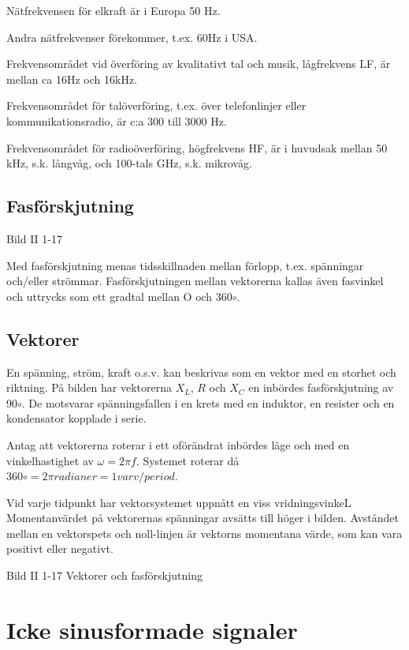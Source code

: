 \documentclass[a4paper,twoside,twocolumn,openright]{book}
\begin{document}
Nätfrekvensen för elkraft är i Europa 50 Hz.

Andra nätfrekvenser förekommer, t.ex. 60Hz i USA.

Frekvensområdet vid överföring av kvalitativt tal och musik, lågfrekvens LF, är mellan ca 16Hz och 16kHz.

Frekvensområdet för talöverföring, t.ex. över telefonlinjer eller kommunikationsradio,
är c:a 300 till 3000 Hz.

Frekvensområdet för radioöverföring, högfrekvens HF, är i huvudsak mellan 50 kHz, s.k.
långvåg, och 100-tals GHz, s.k. mikrovåg.

\subsection{Fasförskjutning}

Bild II 1-17

Med fasförskjutning menas tidsskillnaden mellan förlopp, t.ex. spänningar och/eller
strömmar. Fasförskjutningen mellan vektorerna kallas även fasvinkel och uttrycks
som ett gradtal mellan O och 360$\circ$.

\subsection{Vektorer}

En spänning, ström, kraft o.s.v. kan beskrivas som en vektor med en storhet och riktning.
På bilden har vektorerna $X_L$, $R$ och $X_C$ en inbördes fasförskjutning av 90$\circ$.
De motsvarar spänningsfallen i en krets med en induktor, en resister och en kondensator
kopplade i serie.

Antag att vektorerna roterar i ett oförändrat inbördes läge och med en vinkelhastighet
av $\omega= 2\pi f$. Systemet roterar då $360\circ = 2\pi radianer = 1 varv/period$.

Vid varje tidpunkt har vektorsystemet uppnått en viss vridningsvinkeL Momentanvärdet på
vektorernas spänningar avsätts till höger i bilden. Avståndet mellan en vektorspets och
noll-linjen är vektorns momentana värde, som kan vara positivt eller negativt.

Bild II 1-17 Vektorer och fasförskjutning

\cleardoublepage

\section{Icke sinusformade signaler}
\end{document}
